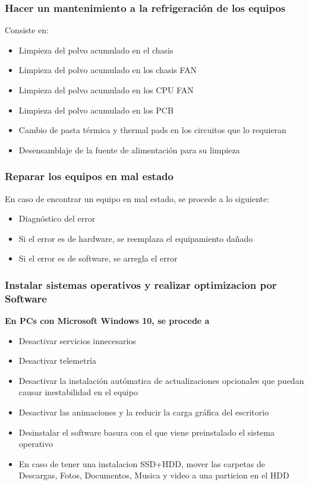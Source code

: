 \documentclass{article}
\begin{document}
		\subsubsection{Hacer un mantenimiento a la refrigeración de los equipos}
			Consiste en:
			\begin{itemize}
			\item Limpieza del polvo acumulado en el chasis
			\item Limpieza del polvo acumulado en los chasis FAN
			\item Limpieza del polvo acumulado en los CPU FAN
			\item Limpieza del polvo acumulado en los PCB
			\item Cambio de pasta térmica y thermal pads en los circuitos que lo requieran
			\item Desensamblaje de la fuente de alimentación para su limpieza
			\end{itemize}
		
		\subsubsection{Reparar los equipos en mal estado}
			En caso de encontrar un equipo en mal estado, se procede a lo siguiente:
			\begin{itemize}
			\item Diagnóstico del error
			\item Si el error es de hardware, se reemplaza el equipamiento dañado
			\item Si el error es de software, se arregla el error
			\end{itemize}
		
		\subsubsection{Instalar sistemas operativos y realizar optimizacion por Software}
			\textbf{En PCs con Microsoft Windows 10, se procede a}
			\begin{itemize}
			\item Desactivar servicios innecesarios
			\item Desactivar telemetría
			\item Desactivar la instalación autómatica de actualizaciones 
			opcionales que puedan causar inestabilidad en el equipo
			\item Desactivar las animaciones y la reducir la carga gráfica del escritorio
			\item Desinstalar el software basura con el que viene preinstalado el sistema operativo
			\item En caso de tener una instalacion SSD+HDD, mover las carpetas de 
			Descargas, Fotos, Documentos, Musica y video a una particion en el HDD
			\end{itemize}
			
\end{document}
